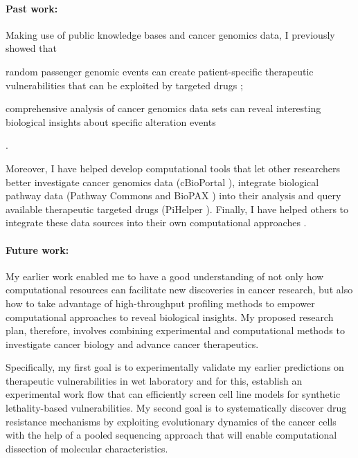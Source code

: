 \documentclass[11pt,letterpaper]{article}
\begin{document}
\paragraph{Past work:}
Making use of public knowledge bases and cancer genomics data, 
I previously showed that 
\begin{inparaenum}[(i)]
 \item random passenger genomic events can create patient-specific therapeutic vulnerabilities that can be exploited by targeted drugs \cite{aksoy2014prediction};
 \item comprehensive analysis of cancer genomics data sets can reveal interesting biological insights about specific alteration events \cite{aksoy2014cancer}
\end{inparaenum}.

Moreover, I have helped develop computational tools that let other researchers better 
investigate cancer genomics data (cBioPortal \cite{gao2013integrative, cerami2012cbio}),
integrate biological pathway data (Pathway Commons and BioPAX \cite{demir2013using,babur2014integrating})
into their analysis and query available therapeutic targeted drugs (PiHelper \cite{aksoy2013pihelper}).
Finally, I have helped others to integrate these data sources into their own computational approaches \cite{ciriello2013emerging,korkut2014perturbation,babur2014systematic}.

\paragraph{Future work:}
My earlier work enabled me to have a good understanding of not only how computational resources can facilitate new discoveries in cancer research,
but also how to take advantage of high-throughput profiling methods to empower computational approaches to reveal biological insights.
My proposed research plan, therefore, involves combining experimental and computational methods to investigate cancer biology and advance cancer therapeutics.

Specifically, my first goal is to experimentally validate my earlier predictions on therapeutic vulnerabilities in wet laboratory
and for this, establish an experimental work flow that can efficiently screen cell line models for synthetic lethality-based vulnerabilities.
My second goal is to systematically discover drug resistance mechanisms by exploiting evolutionary dynamics of the cancer cells
with the help of a pooled sequencing approach that will enable computational dissection of molecular characteristics.
\end{document}
